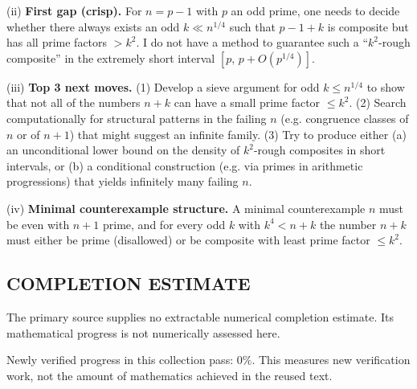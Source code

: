 (ii) \textbf{First gap (crisp).}
For $n=p-1$ with $p$ an odd prime, one needs to decide whether there always exists an odd $k\ll n^{1/4}$ such that $p-1+k$ is composite but has all prime factors $>k^{2}$. I do not have a method to guarantee such a ``$k^{2}$-rough composite'' in the extremely short interval $[p,\,p+O(p^{1/4})]$.

(iii) \textbf{Top 3 next moves.}
(1) Develop a sieve argument for odd $k\le n^{1/4}$ to show that not all of the numbers $n+k$ can have a small prime factor $\le k^{2}$.
(2) Search computationally for structural patterns in the failing $n$ (e.g. congruence classes of $n$ or of $n+1$) that might suggest an infinite family.
(3) Try to produce either (a) an unconditional lower bound on the density of $k^{2}$-rough composites in short intervals, or (b) a conditional construction (e.g. via primes in arithmetic progressions) that yields infinitely many failing $n$.

(iv) \textbf{Minimal counterexample structure.}
A minimal counterexample $n$ must be even with $n+1$ prime, and for every odd $k$ with $k^{4}<n+k$ the number $n+k$ must either be prime (disallowed) or be composite with least prime factor $\le k^{2}$.




\subsection*{COMPLETION ESTIMATE}
The primary source supplies no extractable numerical completion estimate. Its mathematical progress is not numerically assessed here.

Newly verified progress in this collection pass: $0\%$. This measures new verification work, not the amount of mathematics achieved in the reused text.
